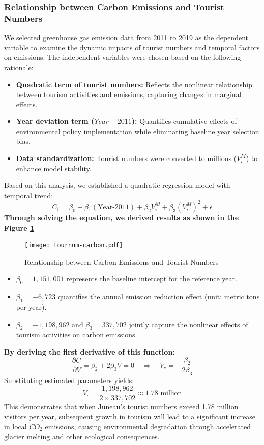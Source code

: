 \documentclass{mcmthesis}
\begin{document}
\subsubsection{Relationship between Carbon Emissions and Tourist Numbers}
We selected greenhouse gas emission data from 2011 to 2019 as the dependent variable to examine the dynamic impacts of tourist numbers and temporal factors on emissions. The independent variables were chosen based on the following rationale:
\begin{itemize}
  \item \textbf{Quadratic term of tourist numbers:} Reflects the nonlinear relationship between tourism activities and emissions, capturing changes in marginal effects.
  \item \textbf{Year deviation term ($Year-2011$):} Quantifies cumulative effects of environmental policy implementation while eliminating baseline year selection bias.
  \item \textbf{Data standardization:} Tourist numbers were converted to millions ($V_i^M$) to enhance model stability.
\end{itemize}
Based on this analysis, we established a quadratic regression model with temporal trend:
\begin{equation}
  C_i = \beta_0 + \beta_1 (\text{Year-2011}) + \beta_2 V_i^M + \beta_3 \left( V_i^M \right)^2 + \epsilon 
\end{equation}
\textbf{Through solving the equation, we derived results as shown in the Figure \ref{fig:carbon}}
\begin{figure}[h!]
  \centering
  \texttt{[image: tournum-carbon.pdf]}
  \caption{Relationship between Carbon Emissions and Tourist Numbers}  %
  \label{fig:carbon}                   %
\end{figure}
\begin{itemize}
  \item $\beta_0 = 1,151,001$ represents the baseline intercept for the reference year.
  \item $\beta_1 = -6,723$ quantifies the annual emission reduction effect (unit: metric tons per year).
  \item $\beta_2 = -1,198,962$ and $\beta_3 = 337,702$ jointly capture the nonlinear effects of tourism activities on carbon emissions.
\end{itemize}
\textbf{By deriving the first derivative of this function:}
\begin{equation}
  \frac{\partial C}{\partial V} = \beta_2 + 2\beta_3 V = 0 \quad \Rightarrow \quad V_c = -\frac{\beta_2}{2\beta_3}
\end{equation}
Substituting estimated parameters yields:
\begin{equation}
  V_c = \frac{1,198,962}{2 \times 337,702} \approx 1.78 \text{ million}
\end{equation}
This demonstrates that when Juneau's tourist numbers exceed 1.78 million visitors per year, subsequent growth in tourism will lead to a significant increase in local $CO_2$ emissions, causing environmental degradation through accelerated glacier melting and other ecological consequences.
\end{document}

